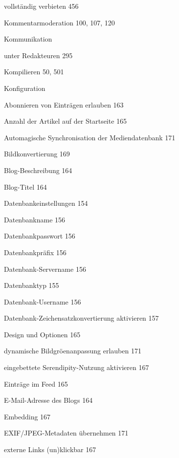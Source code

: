 \documentclass{book}
\renewcommand\subitem{\par}
\begin{document}
\begin{multicols}{2}
\begin{osp-index}
    \subitem vollst\"andig verbieten\hspace{1mm} 456
  \item Kommentarmoderation\hspace{1mm} 100, 107, 120
  \item Kommunikation
    \subitem unter Redakteuren\hspace{1mm} 295
  \item Kompilieren\hspace{1mm} 50, 501
  \item Konfiguration
    \subitem Abonnieren von Eintr\"agen erlauben\hspace{1mm} 163
    \subitem Anzahl der Artikel auf der Startseite\hspace{1mm} 165
    \subitem Automagische Synchronisation der Mediendatenbank\hspace{1mm} 
		171
    \subitem Bildkonvertierung\hspace{1mm} 169
    \subitem Blog-Beschreibung\hspace{1mm} 164
    \subitem Blog-Titel\hspace{1mm} 164
    \subitem Datenbankeinstellungen\hspace{1mm} 154
    \subitem Datenbankname\hspace{1mm} 156
    \subitem Datenbankpasswort\hspace{1mm} 156
    \subitem Datenbankpr\"afix\hspace{1mm} 156
    \subitem Datenbank-Servername\hspace{1mm} 156
    \subitem Datenbanktyp\hspace{1mm} 155
    \subitem Datenbank-Username\hspace{1mm} 156
    \subitem Datenbank-Zeichensatzkonvertierung aktivieren\hspace{1mm} 
		157
    \subitem Design und Optionen\hspace{1mm} 165
    \subitem dynamische Bildgr\"o\IeC {\ss }enanpassung erlauben\hspace{1mm} 
		171
    \subitem eingebettete Serendipity-Nutzung aktivieren\hspace{1mm} 
		167
    \subitem Eintr\"age im Feed\hspace{1mm} 165
    \subitem E-Mail-Adresse des Blogs\hspace{1mm} 164
    \subitem Embedding\hspace{1mm} 167
    \subitem EXIF/JPEG-Metadaten \"ubernehmen\hspace{1mm} 171
    \subitem externe Links (un)klickbar\hspace{1mm} 167

\end{osp-index}
\end{multicols}
\end{document}
